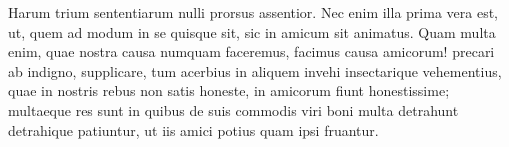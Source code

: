 Harum trium sententiarum nulli prorsus assentior. Nec enim illa prima vera est, ut, quem ad modum in se quisque sit, sic in amicum sit animatus. Quam multa enim, quae nostra causa numquam faceremus, facimus causa amicorum! precari ab indigno, supplicare, tum acerbius in aliquem invehi insectarique vehementius, quae in nostris rebus non satis honeste, in amicorum fiunt honestissime; multaeque res sunt in quibus de suis commodis viri boni multa detrahunt detrahique patiuntur, ut iis amici potius quam ipsi fruantur.
